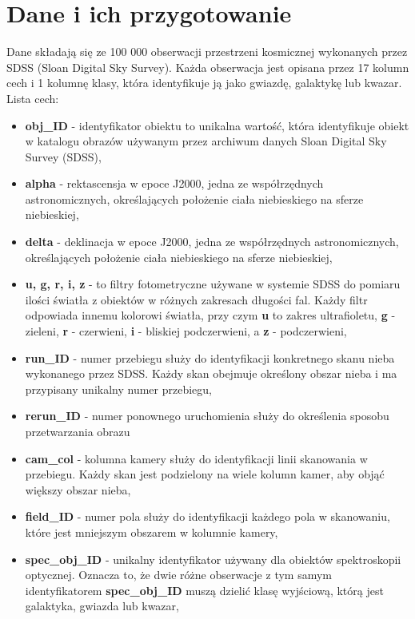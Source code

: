 \documentclass[conference]{IEEEtran}
\begin{document}
\section{Dane i ich przygotowanie}
Dane składają się ze 100 000 obserwacji przestrzeni kosmicznej wykonanych przez SDSS (Sloan Digital Sky Survey). Każda obserwacja jest opisana przez 17 kolumn cech i 1 kolumnę klasy, która identyfikuje ją jako gwiazdę, galaktykę lub kwazar. Lista cech:
\begin{itemize}

    \item \textbf{obj\_ID} - identyfikator obiektu to unikalna wartość, która identyfikuje obiekt w katalogu obrazów używanym przez archiwum danych Sloan Digital Sky Survey (SDSS),
    \item \textbf{alpha} - rektascensja w epoce J2000, jedna ze współrzędnych astronomicznych, określających położenie ciała niebieskiego na sferze niebieskiej,
    \item \textbf{delta} - deklinacja w epoce J2000, jedna ze współrzędnych astronomicznych, określających położenie ciała niebieskiego na sferze niebieskiej,
    \item \textbf{u, g, r, i, z} - to filtry fotometryczne używane w systemie SDSS do pomiaru ilości światła z obiektów w różnych zakresach długości fal. Każdy filtr odpowiada innemu kolorowi światła, przy czym \textbf{u} to zakres ultrafioletu, \textbf{g} - zieleni, \textbf{r} - czerwieni, \textbf{i} - bliskiej podczerwieni, a \textbf{z} - podczerwieni,
    \item \textbf{run\_ID} - numer przebiegu służy do identyfikacji konkretnego skanu nieba wykonanego przez SDSS. Każdy skan obejmuje określony obszar nieba i ma przypisany unikalny numer przebiegu,
    \item \textbf{rerun\_ID} - numer ponownego uruchomienia służy do określenia sposobu przetwarzania obrazu
    \item \textbf{cam\_col} - kolumna kamery służy do identyfikacji linii skanowania w przebiegu. Każdy skan jest podzielony na wiele kolumn kamer, aby objąć większy obszar nieba,
    \item \textbf{field\_ID} - numer pola służy do identyfikacji każdego pola w skanowaniu, które jest mniejszym obszarem w kolumnie kamery,
    \item \textbf{spec\_obj\_ID} - unikalny identyfikator używany dla obiektów spektroskopii optycznej. Oznacza to, że dwie różne obserwacje z tym samym identyfikatorem \textbf{spec\_obj\_ID} muszą dzielić klasę wyjściową, którą jest galaktyka, gwiazda lub kwazar,

\end{itemize}
\end{document}
